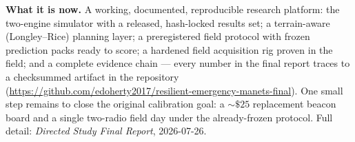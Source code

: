\documentclass[11pt]{article}
\begin{document}
\textbf{What it is now.}
A working, documented, reproducible research platform: the two-engine
simulator with a released, hash-locked results set; a terrain-aware
(Longley--Rice) planning layer; a preregistered field protocol with frozen
prediction packs ready to score; a hardened field acquisition rig proven in
the field; and a complete evidence chain --- every number in the final report
traces to a checksummed artifact in the repository
(\url{https://github.com/edoherty2017/resilient-emergency-manets-final}).
One small step remains to close the original calibration goal: a
${\sim}\$25$ replacement beacon board and a single two-radio field day under
the already-frozen protocol. Full detail: \emph{Directed Study Final Report},
2026-07-26.
\end{document}
